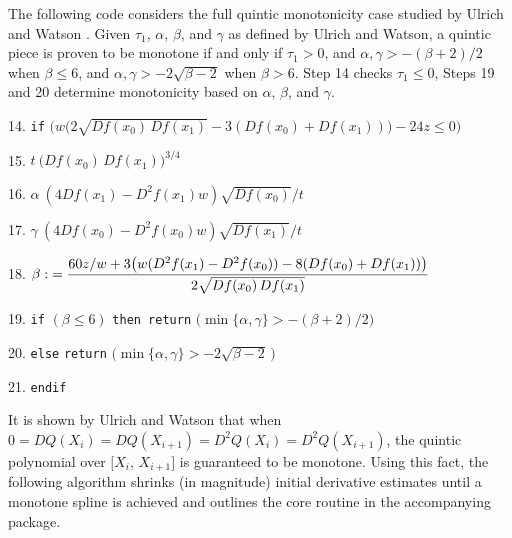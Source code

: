 \begin{plain}
{\item{} {The following code considers the full quintic monotonicity
case studied by Ulrich and Watson \cite{ulrich1994positivity}. Given $\tau_1$, $\alpha$,
$\beta$, and $\gamma$ as defined by Ulrich and Watson, a quintic
piece is proven to be monotone if and only if
$\tau_1 > 0$, and $\alpha, \gamma > -(\beta+2)/2$ when $\beta \leq 6$,
and $\alpha, \gamma > -2 \sqrt{\beta-2}$ when $\beta > 6$.
Step 14 checks $\tau_1 \le 0$, Steps 19 and 20 determine monotonicity based
on $\alpha$, $\beta$, and $\gamma$.}

\item{14.} {\tt if} $\bigl( w\bigl(2\sqrt{Df(x_0)\,Df(x_1)} - 3(Df(x_0) +
  Df(x_1))\bigr) - 24z \leq 0 \bigr)$
\item{} 
\item{15.} $t \: \bigl(Df(x_0)\, Df(x_1)\bigr)^{3/4}$
\item{16.} $\alpha \: (4 Df(x_1) - D^2f(x_1)w) \sqrt{Df(x_0)} / t$
\item{17.} $\gamma \: (4 Df(x_0) - D^2f(x_0)w) \sqrt{Df(x_1)} / t$
\item{18.} $\displaystyle \beta \: {60z/w + 3\bigl(w(D^2f(x_1) -
  D^2f(x_0)) - 8(Df(x_0) + Df(x_1))\bigr) \over 2 \sqrt{Df(x_0)\,Df(x_1)}}$
\item{19.} {\tt if} $(\beta \leq 6)$ {\tt then return}
$\bigl( \min\{\alpha,\gamma\} > - (\beta + 2) / 2 \bigr)$
\item{20.} {\tt else} {\tt return}
$\bigl( \min\{\alpha,\gamma\} > -2 \sqrt{\beta - 2}\,\bigr)$
\item{21.} {\tt endif}
}
\vskip 5mm
\end{plain}

It is shown by Ulrich and Watson \cite{ulrich1994positivity} that when $0 = DQ(X_i) =
DQ(X_{i+1}) = D^2Q(X_i) = D^2Q(X_{i+1})$, the quintic polynomial
over $[X_i$, $X_{i+1}]$ is guaranteed to be monotone. Using this fact, the
following algorithm shrinks (in magnitude) initial derivative estimates
until a monotone spline is achieved and outlines the core routine in the
accompanying package.

